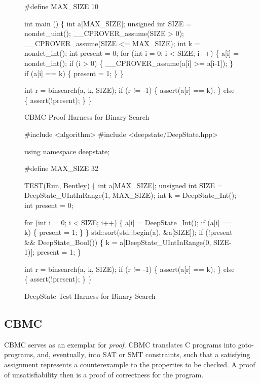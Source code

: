 \documentclass[sigplan]{acmart}
\begin{document}
\begin{figure}
  {\scriptsize
  \begin{code}
\#define MAX\_SIZE 10

int main () \{
  int a[MAX\_SIZE];
  unsigned int SIZE = nondet\_uint();
  \_\_CPROVER\_assume(SIZE > 0);
  \_\_CPROVER\_assume(SIZE <= MAX\_SIZE);
  int k = nondet\_int();
  int present = 0;
  for (int i = 0; i < SIZE; i++) \{
    a[i] = nondet\_int();
    if (i > 0) \{
      \_\_CPROVER\_assume(a[i] >= a[i-1]);
    \}
    if (a[i] == k) \{
      present = 1;
    \}
  \}

  int r = binsearch(a, k, SIZE);
  if (r != -1) \{
    assert(a[r] == k);
  \} else \{
    assert(!present);
  \}
  \}
\end{code}
}
\caption{CBMC Proof Harness for Binary Search}
\label{fig:cbmc}
\end{figure}


\begin{figure}
{\scriptsize
  \begin{code}
\#include <algorithm>
\#include <deepstate/DeepState.hpp>

using namespace deepstate;

\#define MAX\_SIZE 32

TEST(Run, Bentley) \{
  int a[MAX\_SIZE];
  unsigned int SIZE = DeepState\_UIntInRange(1, MAX\_SIZE);
  int k = DeepState\_Int();
  int present = 0;

  for (int i = 0; i < SIZE; i++) \{
    a[i] = DeepState\_Int();
    if (a[i] == k) \{
      present = 1;
    \}
  \}
  std::sort(std::begin(a), \&a[SIZE]);
  if (!present \&\& DeepState\_Bool()) \{
    k = a[DeepState\_UIntInRange(0, SIZE-1)];
    present = 1;
  \}

  int r = binsearch(a, k, SIZE);
  if (r != -1) \{
    assert(a[r] == k);
  \} else \{
    assert(!present);
  \}
\}
\end{code}
}
\caption{DeepState Test Harness for Binary Search}
\label{fig:deepstate}
\end{figure}


\subsection{CBMC}


CBMC serves as an exemplar for \emph{proof}.  CBMC
translates C programs into goto-programs, and, eventually, into SAT or
SMT constraints, such that a satisfying assignment represents a
counterexample to the properties to be checked.  A proof of
unsatisfiability then is a proof of correctness for the program.
\end{document}
